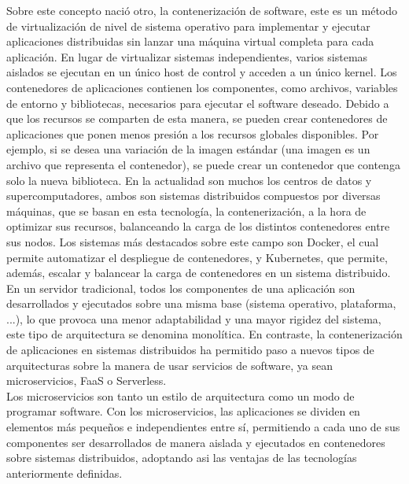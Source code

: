 \documentclass[11pt]{article}
\begin{document}
			Sobre este concepto nació otro, la contenerización de software, este es un método de virtualización de nivel de sistema operativo para implementar y ejecutar aplicaciones distribuidas
			sin lanzar una máquina virtual completa para cada aplicación.
			En lugar de virtualizar sistemas independientes, varios sistemas aislados se ejecutan en un único host de control y acceden a un único kernel. 
			Los contenedores de aplicaciones contienen los componentes, como archivos, variables de entorno y bibliotecas, necesarios para ejecutar el software deseado.
			Debido a que los recursos se comparten de esta manera, se pueden crear contenedores de aplicaciones que ponen menos presión a los recursos globales disponibles. 
			Por ejemplo, si se desea una variación de la imagen estándar (una imagen es un archivo que representa el contenedor), se puede crear un contenedor que contenga solo la nueva biblioteca.
			En la actualidad son muchos los centros de datos y supercomputadores, ambos son sistemas distribuidos compuestos por diversas máquinas, que se basan en esta tecnología, la contenerización, a la hora
			de optimizar sus recursos, balanceando la carga de los distintos contenedores entre sus nodos. Los sistemas más destacados sobre este campo son Docker, el cual permite automatizar el despliegue de
			contenedores, y Kubernetes, que permite, además, escalar y balancear la carga de contenedores en un sistema distribuido. \\

			En un servidor tradicional, todos los componentes de una aplicación son desarrollados y ejecutados sobre una misma base (sistema operativo, plataforma, ...), lo que provoca una menor adaptabilidad y
			una mayor rigidez del sistema, este tipo de arquitectura se denomina monolítica.
			En contraste, la contenerización de aplicaciones en sistemas distribuidos ha permitido paso a nuevos tipos de arquitecturas sobre la manera de usar servicios de software, ya sean microservicios, FaaS o
			Serverless. \\
			Los microservicios son tanto un estilo de arquitectura como un modo de programar software.
			Con los microservicios, las aplicaciones se dividen en elementos más pequeños e independientes entre sí, permitiendo a cada uno de sus componentes ser desarrollados de manera aislada y ejecutados
			en contenedores sobre sistemas distribuidos, adoptando asi las ventajas de las tecnologías anteriormente definidas.
\end{document}
